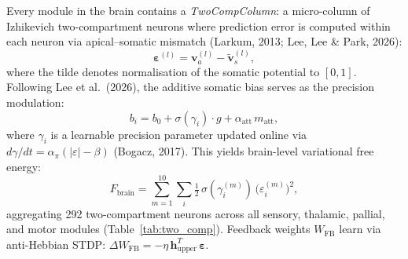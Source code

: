 \documentclass[12pt]{article}
\begin{document}
Every module in the brain contains a \emph{TwoCompColumn}: a
micro-column of Izhikevich two-compartment neurons where
prediction error is computed within each neuron via apical--somatic
mismatch (Larkum, 2013; Lee, Lee \& Park, 2026):
\begin{equation}\label{eq:pred_error}
  \boldsymbol{\varepsilon}^{(l)} = \mathbf{v}_a^{(l)}
    - \widetilde{\mathbf{v}}_s^{(l)},
\end{equation}
where the tilde denotes normalisation of the somatic potential
to $[0, 1]$.
Following Lee et al.\ (2026), the additive somatic bias
serves as the precision modulation:
\begin{equation}\label{eq:bias_precision}
  b_i = b_0 + \sigma(\gamma_i)\cdot g + \alpha_\text{att}\,m_\text{att},
\end{equation}
where $\gamma_i$ is a learnable precision parameter updated online
via $d\gamma/dt = \alpha_\pi(|\varepsilon| - \beta)$ (Bogacz, 2017).
This yields brain-level variational free energy:
\begin{equation}\label{eq:brain_fe}
  F_\text{brain} = \sum_{m=1}^{10}\sum_i
    \tfrac{1}{2}\,\sigma(\gamma_i^{(m)})\,
    \bigl(\varepsilon_i^{(m)}\bigr)^2,
\end{equation}
aggregating 292 two-compartment neurons across all sensory, thalamic,
pallial, and motor modules (Table~\ref{tab:two_comp}).
Feedback weights $W_\text{FB}$ learn via anti-Hebbian STDP:
$\Delta W_\text{FB} = -\eta\,\mathbf{h}_\text{upper}^T\,\boldsymbol{\varepsilon}$.
\end{document}
